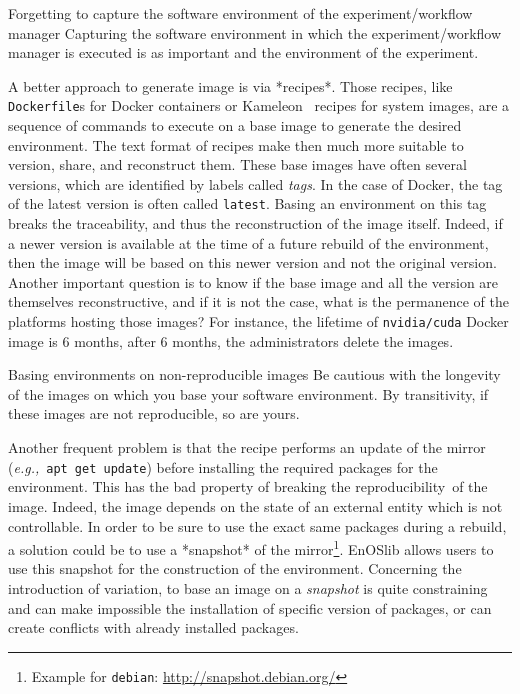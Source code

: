 \documentclass[sigconf]{acmart}
\newcommand{\repro}{reproducibility}
\newcommand{\eg}{\emph{e.g.,}}
\begin{document}
\begin{trap}{Forgetting to capture the software environment of the experiment/workflow manager}{}
Capturing the software environment in which the experiment/workflow manager is executed is as important and the environment of the experiment.
\end{trap}

A better approach to generate image is via *recipes*.
Those recipes, like \texttt{Dockerfile}s for Docker containers or Kameleon\ \cite{ruiz_reconstructable_2015} recipes for system images, are a sequence of commands to execute on a base image to generate the desired environment.
The text format of recipes make then much more suitable to version, share, and reconstruct them.
These base images have often several versions, which are identified by labels called \emph{tags}.
In the case of Docker, the tag of the latest version is often called \texttt{latest}.
Basing an environment on this tag breaks the traceability, and thus the reconstruction of the image itself.
Indeed, if a newer version is available at the time of a future rebuild of the environment, then the image will be based on this newer version and not the original version.
Another important question is to know if the base image and all the version are themselves reconstructive, and if it is not the case, what is the permanence of the platforms hosting those images?
For instance, the lifetime of \texttt{nvidia/cuda} Docker image is 6 months, after 6 months, the administrators delete the images.

\begin{trap}{Basing environments on non-reproducible images}{}
Be cautious with the longevity of the images on which you base your software environment.
By transitivity, if these images are not reproducible, so are yours.
\end{trap}

Another frequent problem is that the recipe performs an update of the mirror (\eg\ \texttt{apt get update}) before installing the required packages for the environment.
This has the bad property of breaking the \repro\ of the image.
Indeed, the image depends on the state of an external entity which is not controllable.
In order to be sure to use the exact same packages during a rebuild, a solution could be to use a *snapshot* of the mirror\footnote{Example for \texttt{debian}: \url{http://snapshot.debian.org/}}.
EnOSlib allows users to use this snapshot for the construction of the environment.
Concerning the introduction of variation, to base an image on a \emph{snapshot} is quite constraining and can make impossible the installation of specific version of packages, or can create conflicts with already installed packages.
\end{document}
